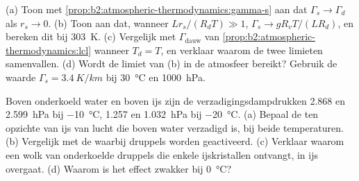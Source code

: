 \begin{exercise}[$\star\star\star$]\label{exo:b2:atmospheric-thermodynamics:11}
(a) Toon met \cref{prop:b2:atmospheric-thermodynamics:gamma-s} aan dat $\Gamma_s \to \Gamma_d$
als $r_s \to 0$. (b) Toon aan dat, wanneer $Lr_s/(R_dT) \gg 1$, $\Gamma_s \to gR_vT/(LR_d)$, en
bereken dit bij \qty{303}{K}. (c) Vergelijk met $\Gamma_{\text{dauw}}$ van
\cref{prop:b2:atmospheric-thermodynamics:lcl} wanneer $T_d = T$, en verklaar waarom de twee limieten
samenvallen. (d) Wordt de limiet van (b) in de atmosfeer bereikt? Gebruik de waarde $\Gamma_s =
\qty{3.4}{K/km}$ bij \qty{30}{\celsius} en \qty{1000}{hPa}.
\end{exercise}

\begin{exercise}[$\star\star\star$]\label{exo:b2:atmospheric-thermodynamics:12}
Boven onderkoeld water en boven ijs zijn de verzadigingsdampdrukken 2.868 en
\qty{2.599}{hPa} bij \qty{-10}{\celsius}, 1.257 en \qty{1.032}{hPa} bij \qty{-20}{\celsius}.
(a) Bepaal de  ten opzichte van ijs van lucht die boven water verzadigd is, bij beide temperaturen. (b)
Vergelijk met de  waarbij druppels worden geactiveerd. (c) Verklaar waarom een wolk van
onderkoelde druppels die enkele ijskristallen ontvangt, in ijs overgaat. (d) Waarom is het effect
zwakker bij \qty{0}{\celsius}?
\end{exercise}

